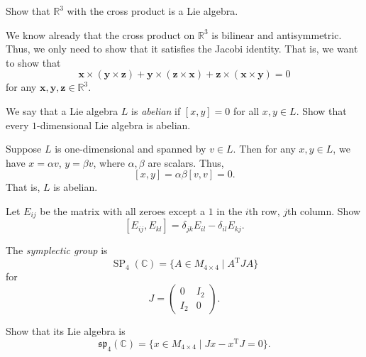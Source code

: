 \documentclass[12 pt, letterpaper]{hmcpset}
\begin{document}
\begin{problem}[1.]
	Show that $\mathbb{R}^{3}$ with the cross product is a Lie algebra.
\end{problem}

\begin{solution}
	We know already that the cross product on $\mathbb{R}^{3}$ is bilinear and antisymmetric. Thus, we only need to show that it satisfies the Jacobi identity. That is, we want to show that
	 \[
		\mathbf{x} \times (\mathbf{y} \times \mathbf{z}) + \mathbf{y} \times (\mathbf{z} \times \mathbf{x}) + \mathbf{z} \times (\mathbf{x} \times \mathbf{y}) = 0
	\]
	for any $\mathbf{x}, \mathbf{y}, \mathbf{z} \in \mathbb{R}^{3}$.
\end{solution}

\pagebreak

\begin{problem}[2.]
	We say that a Lie algebra $L$ is \emph{abelian} if $[x, y] = 0$ for all $x, y \in L$. Show that every $1$-dimensional Lie algebra is abelian.
\end{problem}

\begin{solution}
	Suppose $L$ is one-dimensional and spanned by $v \in L$. Then for any $x, y \in L$, we have $x = \alpha v$, $y = \beta v$, where $\alpha, \beta$ are scalars. Thus,
	\[
		[x, y] = \alpha \beta [v, v] = 0.
	\]
	That is, $L$ is abelian.
\end{solution}

\pagebreak

\begin{problem}[3.]
	Let $E_{i j}$ be the matrix with all zeroes except a $1$ in the $i$th row, $j$th column. Show
	\[
		[E_{i j}, E_{k l}] = \delta_{j k} E_{i l} - \delta_{i l} E_{k j}.
	\]
\end{problem}

\pagebreak

\begin{problem}[4.]
	The \emph{symplectic group} is
	\[
		\operatorname{SP}_{4}(\mathbb{C}) = \{ A \in M_{4 \times 4} \mid A^{\mathrm{T}} J A \}
	\]
	for
	\[
		J = \begin{pmatrix}
			0 & I_{2} \\
			I_{2} & 0
		\end{pmatrix}.
	\]

	Show that its Lie algebra is
	\[
		\mathfrak{sp}_{4}(\mathbb{C}) = \{ x \in M_{4 \times 4} \mid J x - x^{\mathrm{T}} J = 0 \}.
	\]
\end{problem}
\end{document}
